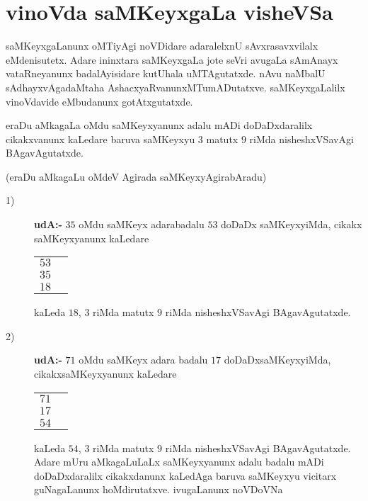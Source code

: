 \chapter{vinoVda saMKeyxgaLa visheVSa}

saMKeyxgaLanunx oMTiyAgi noVDidare adaralelxnU sAvxrasavxvilalx eMdenisutetx. Adare ininxtara saMKeyxgaLa jote seVri avugaLa sAmAnayx vataRneyanunx badalAyisidare kutUhala uMTAgutatxde. nAvu naMbalU sAdhayxvAgadaMtaha AshacxyaRvanunxMTumADutatxve. saMKeyxgaLalilx vinoVdavide eMbudanunx gotAtxgutatxde.

eraDu aMkagaLa oMdu saMKeyxyanunx adalu mADi doDaDxdaralilx cikakxvanunx kaLedare baruva saMKeyxyu $3$ matutx $9$ riMda nisheshxVSavAgi BAgavAgutatxde.

(eraDu aMkagaLu oMdeV Agirada saMKeyxyAgirabAradu)
\begin{description}
\item[{\rm 1)}] {\bf udA:-} $35$ oMdu saMKeyx adarabadalu $53$ doDaDx saMKeyxyiMda, cikakx saMKeyxyanunx kaLedare
  \begin{center}
\begin{tabular}{cc}
  $53$&\\
  $35$&\\\cline{1-1}
  $18$&
\end{tabular}
  \end{center}
  kaLeda $18$, $3$ riMda matutx $9$ riMda nisheshxVSavAgi BAgavAgutatxde.
  
\item[{\rm 2)}] {\bf udA:-} $71$ oMdu saMKeyx adara badalu $17$ doDaDxsaMKeyxyiMda, cikakxsaMKeyxyanunx kaLedare
    \begin{center}
\begin{tabular}{cc}
  $71$&\\
  $17$&\\\cline{1-1}
  $54$&
\end{tabular}
  \end{center}

    kaLeda $54$, $3$ riMda matutx $9$ riMda nisheshxVSavAgi BAgavAgutatxde. Adare mUru aMkagaLuLaLx saMKeyxyanunx adalu badalu mADi doDaDxdaralilx cikakxdanunx kaLedAga baruva saMKeyxyu vicitarx guNagaLanunx hoMdirutatxve. ivugaLanunx noVDoVNa
\end{description}

